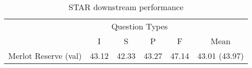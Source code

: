 \begin{table}[t]
	\centering
	\caption{STAR downstream performance}
	\label{tab:star_ppt}
	\begin{tabular}{lccccc}
        \toprule
        \multicolumn{1}{c}{}        & \multicolumn{4}{c}{Question Types}        & \multicolumn{1}{c}{} \\
                                      \cmidrule(){2-5}
                                    & I           & S        & P          & F           & Mean \\
        \cmidrule(r){1-1}             \cmidrule(){2-5}                          \cmidrule(l){6-6}
    Merlot Reserve (val)        & 43.12       & 42.33    & 43.27      & 47.14       & 43.01 (43.97) \\

\end{tabular}
\end{table}
